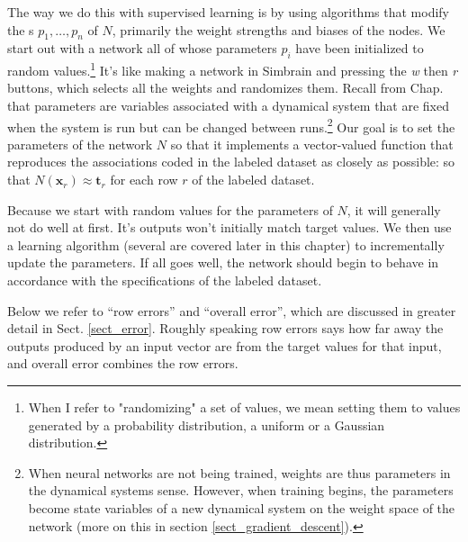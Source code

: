 The way we do this with supervised learning is by using algorithms that modify the s  $p_1,\dots,p_n$ of $N$, primarily the weight strengths and biases of the nodes. We start out with a network all of whose parameters $p_i$ have been initialized to random values.\footnote{When I refer to "randomizing" a set of values, we mean setting them to values generated by a probability distribution, \eg a uniform or a Gaussian distribution.}  It's like making a network in Simbrain and pressing the \emph{w} then \emph{r} buttons, which selects all the weights and randomizes them. Recall from Chap.  that parameters are variables associated with a dynamical system that  are fixed when the system is run but can be changed between runs.\footnote{When neural networks are not being trained, weights are thus parameters in the dynamical systems sense. However, when training begins, the parameters become state variables of a new dynamical system on the weight space of the network (more on this in section \ref{sect_gradient_descent}).} Our goal is to set the parameters of the network $N$ so that it implements a vector-valued function that reproduces the associations coded in the labeled dataset as closely as possible: so that $N(\mathbf{x}_r) \approx \mathbf{t}_r$ for each row $r$ of the labeled dataset.

Because we start with random values for the parameters of $N$, it will generally not do well at first. It's outputs won't  initially match target values. We then use a learning algorithm (several are covered later in this chapter) to incrementally update the parameters. If all goes well, the network should begin to behave in accordance with the specifications of the labeled dataset.

Below we refer to ``row errors''  and ``overall error'', which are discussed in greater detail in Sect. \ref{sect_error}. Roughly speaking row errors says how far away the outputs produced by an input vector are from the target values for that input, and overall error combines the row errors.

